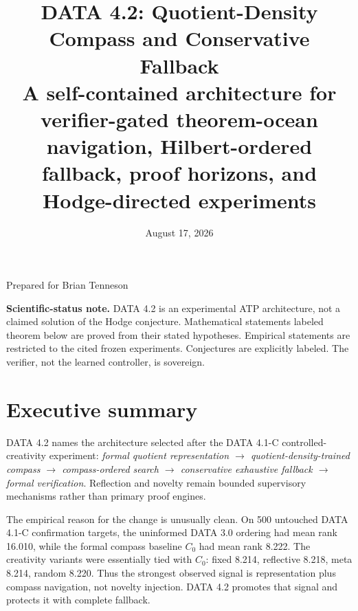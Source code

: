 \documentclass[11pt]{article}
\title{\textbf{DATA 4.2: Quotient-Density Compass and Conservative Fallback}\\\large A self-contained architecture for verifier-gated theorem-ocean navigation, Hilbert-ordered fallback, proof horizons, and Hodge-directed experiments}
\date{August 17, 2026}
\begin{document}
\begin{titlepage}\centering\vspace*{1in}{\Huge\bfseries DATA 4.2\par}\vspace{.2in}{\LARGE Quotient-Density Compass and Conservative Fallback\par}\vspace{.35in}{\large Formal architecture, theorem package, experimental evidence, and Hodge research program\par}\vfill
{\large Prepared for Brian Tenneson\par}\vspace{.1in}{\large August 17, 2026\par}\vspace{.45in}
\begin{minipage}{.88\textwidth}\small\textbf{Scientific-status note.} DATA 4.2 is an experimental ATP architecture, not a claimed solution of the Hodge conjecture. Mathematical statements labeled theorem below are proved from their stated hypotheses. Empirical statements are restricted to the cited frozen experiments. Conjectures are explicitly labeled. The verifier, not the learned controller, is sovereign.\end{minipage}\vfill\end{titlepage}
\tableofcontents\newpage
\section{Executive summary}
DATA 4.2 names the architecture selected after the DATA 4.1-C controlled-creativity experiment: \emph{formal quotient representation $\rightarrow$ quotient-density-trained compass $\rightarrow$ compass-ordered search $\rightarrow$ conservative exhaustive fallback $\rightarrow$ formal verification}. Reflection and novelty remain bounded supervisory mechanisms rather than primary proof engines.

The empirical reason for the change is unusually clean. On 500 untouched DATA 4.1-C confirmation targets, the uninformed DATA 3.0 ordering had mean rank 16.010, while the formal compass baseline $C_0$ had mean rank 8.222. The creativity variants were essentially tied with $C_0$: fixed 8.214, reflective 8.218, meta 8.214, random 8.220. Thus the strongest observed signal is representation plus compass navigation, not novelty injection. DATA 4.2 promotes that signal and protects it with complete fallback.
\end{document}
